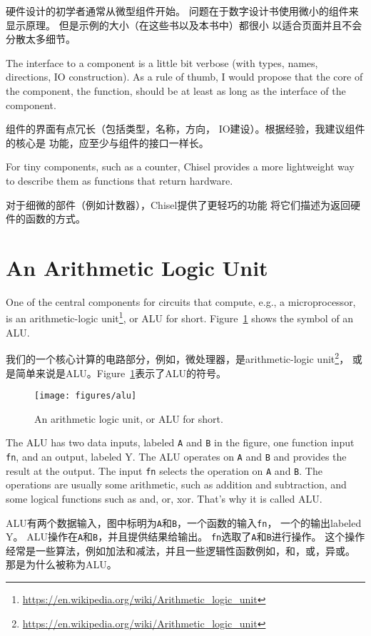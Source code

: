 \documentclass[%
    10pt,
    headinclude, footexclude,
    openright, %
    notitlepage,
    cleardoubleempty,
    headsepline,
    pointlessnumbers,
    bibtotoc, idxtotoc,
    ]{scrbook}
\newcommand{\code}[1]{{\small{\texttt{#1}}}}
\newcommand{\scale}{0.7}
\newcommand{\myref}[2]{\href{#1}{#2}}
\renewcommand{\myref}[2]{{#2}{\footnote{\url{#1}}}}
\begin{document}
硬件设计的初学者通常从微型组件开始。
问题在于数字设计书使用微小的组件来显示原理。
但是示例的大小（在这些书以及本书中）都很小
以适合页面并且不会分散太多细节。

The interface to a component is a little bit verbose (with types, names, directions,
IO construction). As a rule of thumb, I would propose that the core of the component,
the function, should be at least as long as the interface of the component.


组件的界面有点冗长（包括类型，名称，方向，
IO建设）。根据经验，我建议组件的核心是
功能，应至少与组件的接口一样长。

For tiny components, such as a counter, Chisel provides a more lightweight
way to describe them as functions that return hardware.


对于细微的部件（例如计数器），Chisel提供了更轻巧的功能
将它们描述为返回硬件的函数的方式。


\section{An Arithmetic Logic Unit}

One of the central components for circuits that compute, e.g., a microprocessor, is an
\myref{https://en.wikipedia.org/wiki/Arithmetic_logic_unit}{arithmetic-logic unit},
or ALU for short. Figure~\ref{fig:alu} shows the symbol of an ALU.

我们的一个核心计算的电路部分，例如，微处理器，是\myref{https://en.wikipedia.org/wiki/Arithmetic_logic_unit}{arithmetic-logic unit}，
或是简单来说是ALU。Figure~\ref{fig:alu}表示了ALU的符号。

\begin{figure}
  \centering
  \texttt{[image: figures/alu]}
  \caption{An arithmetic logic unit, or ALU for short.}
  \label{fig:alu}
\end{figure}

The ALU has two data inputs, labeled \code{A} and \code{B} in the figure, one function input \code{fn},
and an output, labeled {Y}. The ALU operates on \code{A} and \code{B} and provides the result
at the output. The input \code{fn} selects the operation on \code{A} and \code{B}.
The operations are usually some arithmetic, such as addition and subtraction, and some logical
functions such as and, or, xor. That's why it is called ALU.

ALU有两个数据输入，图中标明为\code{A}和\code{B}，一个函数的输入\code{fn}，
一个的输出labeled {Y}。 ALU操作在\code{A}和\code{B}，并且提供结果给输出。
\code{fn}选取了\code{A}和\code{B}进行操作。
这个操作经常是一些算法，例如加法和减法，并且一些逻辑性函数例如，和，或，异或。
那是为什么被称为ALU。
\end{document}

